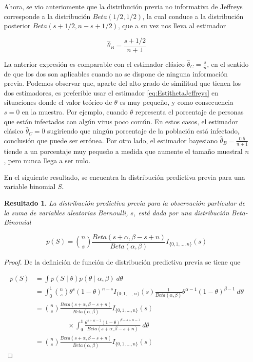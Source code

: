 \documentclass[
  spanish,
]{book}
\newtheorem{proposition}{Resultado}[chapter]
\theoremstyle{definition}
\theoremstyle{definition}
\theoremstyle{definition}
\theoremstyle{definition}
\theoremstyle{remark}
\begin{document}
Ahora, se vio anteriomente que la distribución previa no informativa de
Jeffreys corresponde a la distribución \(Beta(1/2, 1/2)\), la cual conduce
a la distribución posterior \(Beta(s+1/2, n-s+1/2)\), que a su vez nos
lleva al estimador

\begin{equation}
\label{eq:EstithetaJeffreys}
\hat{\theta}_B=\frac{s+1/2}{n+1}
\end{equation}

La anterior expresión es comparable con el estimador clásico
\(\hat{\theta}_C=\frac{s}{n}\), en el sentido de que los dos son
aplicables cuando no se dispone de ninguna información previa. Podemos
observar que, aparte del alto grado de similitud que tienen los dos
estimadores, es preferible usar el estimador \eqref{eq:EstithetaJeffreys} en situaciones donde el valor teórico de \(\theta\) es muy pequeño, y
como consecuencia \(s=0\) en la muestra. Por ejemplo, cuando \(\theta\)
representa el porcentaje de personas que están infectados con algún
virus poco común. En estos casos, el estimador clásico
\(\hat{\theta}_C=0\) sugiriendo que ningún porcentaje de la población está
infectado, conclusión que puede ser errónea. Por otro lado, el estimador
bayesiano \(\hat{\theta}_B=\frac{0.5}{n+1}\) tiende a un porcentaje muy pequeño a medida que aumente el tamaño muestral \(n\),
pero nunca llega a ser nulo.

En el siguiente resultado, se encuentra la distribución predictiva
previa para una variable binomial \(S\).

\begin{proposition}
\protect\hypertarget{prp:unnamed-chunk-13}{}{\label{prp:unnamed-chunk-13} }La distribución predictiva previa para la observación particular de la suma de variables aleatorias Bernoulli, \(s\), está dada por una distribución Beta-Binomial

\begin{equation}
p(S)=\binom{n}{s}\frac{Beta(s+\alpha,\beta-s+n)}{Beta(\alpha,\beta)}I_{\{0,1,\ldots,n\}}(s)
\end{equation}
\end{proposition}

\begin{proof}
\iffalse{} {Prueba. } \fi{}De la definición de función de distribución predictiva previa se tiene que

\begin{align*}
p(S)
&=\int p(S \mid \theta)p(\theta \mid \alpha,\beta)\ d\theta\\
&=\int_0^1\binom{n}{s}\theta^s(1-\theta)^{n-s}I_{\{0,1,\ldots,n\}}(s)
\frac{1}{Beta(\alpha,\beta)}\theta^{\alpha-1}(1-\theta)^{\beta-1}\ d\theta\\
&=\binom{n}{s}\frac{Beta(s+\alpha,\beta-s+n)}{Beta(\alpha,\beta)}I_{\{0,1,\ldots,n\}}(s)\\
&\hspace{2cm}\times\int_0^1\frac{\theta^{s+\alpha-1}(1-\theta)^{\beta-s+n-1}}{Beta(s+\alpha,\beta-s+n)}\ d\theta\\
&=\binom{n}{s}\frac{Beta(s+\alpha,\beta-s+n)}{Beta(\alpha,\beta)}I_{\{0,1,\ldots,n\}}(s)
\end{align*}
\end{proof}
\end{document}
